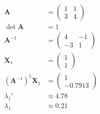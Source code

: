 \documentclass{article}
\begin{document}
\setcounter{subsubsection}{10}
\subsubsection{}

\begin{align*}
  \mathbf{A}                       & = \begin{pmatrix}
                                         1 & 1 \\
                                         3 & 4
                                       \end{pmatrix} \\
  \det \mathbf{A}                  & = 1              \\
  \mathbf{A}^{-1}                  & = \begin{pmatrix}
                                         4  & -1 \\
                                         -3 & 1
                                       \end{pmatrix} \\
  \mathbf{X}_1                     & = \begin{pmatrix}
                                         1 \\
                                         1
                                       \end{pmatrix} \\
  (\mathbf{A}^{-1})^5 \mathbf{X}_1 & = \begin{pmatrix}
                                         1 \\
                                         -0.7913
                                       \end{pmatrix} \\
  \lambda_1'                       & \approx 4.78     \\
  \lambda_1                        & \approx 0.21
\end{align*}

\setcounter{subsubsection}{12}
\subsubsection{}
\end{document}
